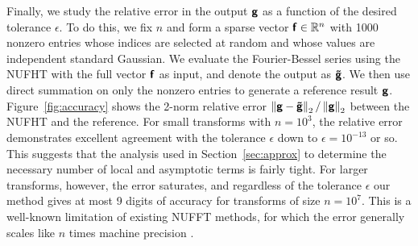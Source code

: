 Finally, we study the relative error in the output $\vct{g}$ as a function of
the desired tolerance $\epsilon$. To do this, we fix $n$ and form a sparse
vector $\vct{f} \in \R^n$ with 1000 nonzero entries whose indices are selected
at random and whose values are independent standard Gaussian. We evaluate the
Fourier-Bessel series using the NUFHT with the full vector $\vct{f}$ as input,
and denote the output as $\vct{\tilde{g}}$. We then use direct summation on only
the nonzero entries to generate a reference result $\vct{g}$.
Figure~\ref{fig:accuracy} shows the 2-norm relative error $\norm[2]{\vct{g} -
\vct{\tilde{g}}} / \norm[2]{\vct{g}}$ between the NUFHT and the reference. For
small transforms with $n=10^3$, the relative error demonstrates excellent
agreement with the tolerance $\epsilon$ down to $\epsilon = 10^{-13}$ or so.
This suggests that the analysis used in Section~\ref{sec:approx} to determine
the necessary number of local and asymptotic terms is fairly tight. For larger
transforms, however, the error saturates, and regardless of the tolerance
$\epsilon$ our method gives at most 9 digits of accuracy for transforms of size
$n=10^7$. This is a well-known limitation of existing NUFFT methods, for which
the error generally scales like $n$ times machine precision \cite[Remark
9]{barnett2019parallel}.

